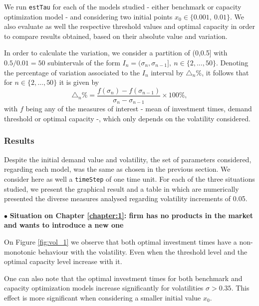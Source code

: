 We run \texttt{estTau} for each of the models studied - either benchmark or capacity optimization model - and considering two initial points $x_0 \in \{0.001, \ 0.01 \}$. We also evaluate as well the respective threshold values and optimal capacity in order to compare results obtained, based on their absolute value and variation.

In order to calculate the variation, we consider a partition of (0,0.5] with $0.5/0.01=50$ subintervals of the form $I_n=(\sigma_n, \sigma_{n-1}],\ n \in \{2,...,50\}$. Denoting the percentage of variation associated to the $I_n$ interval by $\triangle_n \%$, it follows that for $n \in \{2,...,50\}$ it is given by
$$\triangle_n \% = \frac{f(\sigma_n)-f(\sigma_{n-1})}{\sigma_n-\sigma_{n-1}} \times 100 \%,$$
with $f$ being any of the measures of interest - mean of investment times, demand threshold or optimal capacity -, which only depends on the volatility considered.




\subsubsection{Results}

Despite the initial demand value and volatility, the set of parameters considered, regarding each model, was the same as chosen in the previous section. We consider here as well a \texttt{timeStep} of one time unit. For each of the three situations studied, we present the graphical result and a table in which are numerically presented the diverse measures analysed regarding volatility increments of 0.05.

\vspace{3mm}
$\bullet$ \textbf{Situation on Chapter \ref{chapter:1}: firm has no products in the market and wants to introduce a new one}

On Figure \ref{fig:vol_1} we observe that both optimal investment times have a non-monotonic behaviour with the volatility. Even when the threshold level and the optimal capacity level increase with it.

One can also note that the optimal investment times for both benchmark and capacity optimization models increase significantly for volatilities $\sigma>0.35$. This effect is more significant when considering a smaller initial value $x_0$.

